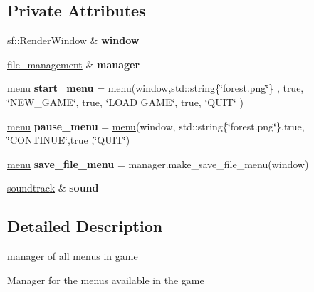 \subsection*{Private Attributes}
\begin{DoxyCompactItemize}
\item 
\mbox{\label{classmenu__management_ab79fa0c3480a52f3cd603c77e8f7008f}} 
sf\+::\+Render\+Window \& {\bfseries window}
\item 
\mbox{\label{classmenu__management_a0c9bf334940ea0d4576e371e1eaa5c9f}} 
\hyperlink{classfile__management}{file\+\_\+management} \& {\bfseries manager}
\item 
\mbox{\label{classmenu__management_aea347d4a93f4e7819dae28b5ba320857}} 
\hyperlink{classmenu}{menu} {\bfseries start\+\_\+menu} = \hyperlink{classmenu}{menu}(window,std\+::string\{\char`\"{}forest.\+png\char`\"{}\} , true, \char`\"{}N\+E\+W\+\_\+\+G\+A\+ME\char`\"{}, true, \char`\"{}L\+O\+AD G\+A\+ME\char`\"{}, true, \char`\"{}Q\+U\+IT\char`\"{} )
\item 
\mbox{\label{classmenu__management_a125b772090ca2c54c2689b408700eb02}} 
\hyperlink{classmenu}{menu} {\bfseries pause\+\_\+menu} = \hyperlink{classmenu}{menu}(window, std\+::string\{\char`\"{}forest.\+png\char`\"{}\},true, \char`\"{}C\+O\+N\+T\+I\+N\+UE\char`\"{},true ,\char`\"{}Q\+U\+IT\char`\"{})
\item 
\mbox{\label{classmenu__management_a1ca190cfc1fcd91354ce00ad5cc1dea6}} 
\hyperlink{classmenu}{menu} {\bfseries save\+\_\+file\+\_\+menu} = manager.\+make\+\_\+save\+\_\+file\+\_\+menu(window)
\item 
\mbox{\label{classmenu__management_a7c05d72347e629a180ff9114295f00d5}} 
\hyperlink{classsoundtrack}{soundtrack} \& {\bfseries sound}
\end{DoxyCompactItemize}


\subsection{Detailed Description}
manager of all menu\textquotesingle{}s in game 

Manager for the menu\textquotesingle{}s available in the game

